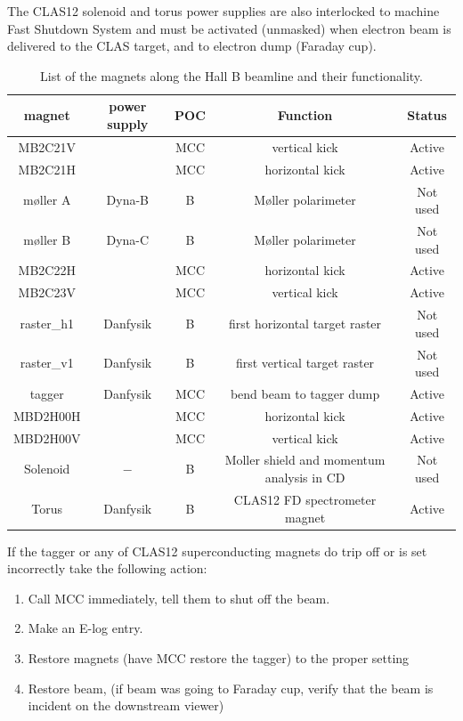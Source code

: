 \documentclass[12pt]{article}
\begin{document}
The CLAS12 solenoid and torus power supplies are also interlocked to machine Fast Shutdown System and must be activated (unmasked) when  electron beam is delivered to the CLAS target, and to electron dump (Faraday cup). 

\begin{table}[tbhp]
\vspace{0.3cm}
{\centering \begin{tabular}{|c|c|c|c|c|}
\hline 
magnet&
power supply&
POC&
Function&
Status\\
\hline 
\hline 
MB2C21V&
&
MCC&
vertical kick&
Active\\
\hline 
MB2C21H&
&
MCC&
horizontal kick&
Active\\
\hline 
m{\o}ller A&
Dyna-B&
B&
M{\o}ller polarimeter&
Not used\\
\hline 
m{\o}ller B&
Dyna-C&
B&
M{\o}ller polarimeter&
Not used\\
\hline 
MB2C22H&
&
MCC&
horizontal kick&
Active\\
\hline 
MB2C23V&
&
MCC&
vertical kick&
Active\\
\hline 
raster\_h1&
Danfysik&
B&
first horizontal target raster&
Not used\\
\hline 
raster\_v1&
Danfysik&
B&
first vertical target raster&
Not used\\
\hline 
tagger&
Danfysik&
MCC&
bend beam to tagger dump&
Active\\
\hline 
MBD2H00H&
&
MCC&
horizontal kick&
Active\\
\hline 
MBD2H00V&
&
MCC&
vertical kick&
Active\\
\hline 
Solenoid&
$-$&
B&
Moller shield and momentum analysis in CD&
Not used\\
\hline 
Torus&
Danfysik&
B&
CLAS12 FD spectrometer magnet&
Active\\
\hline 
\end{tabular}\par}
\vspace{0.3cm}


\caption{List of the magnets along the Hall B beamline and their functionality.\label{magnets}}
\end{table} 

If the tagger or any of CLAS12 superconducting magnets do trip off or is set incorrectly take the following action:

\begin{enumerate}
\item Call MCC immediately, tell them to shut off the beam.
\item Make an E-log entry.
\item Restore magnets (have MCC restore the tagger) to the proper setting
\item Restore beam, (if beam was going to Faraday cup, verify that the beam is incident on the downstream viewer)
\end{enumerate}
\end{document}
